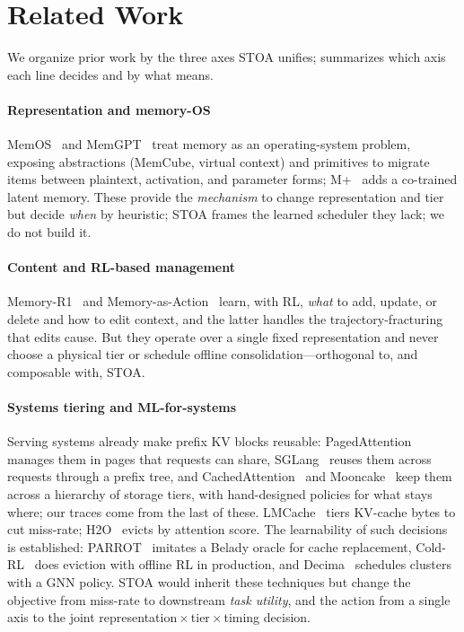 \section{Related Work}
\label{sec:related}

We organize prior work by the three axes STOA unifies;  summarizes which axis each
line decides and by what means.

\paragraph{Representation and memory-OS}
MemOS~\cite{F1_li2025memos} and MemGPT~\cite{P14_packer2023memgpt} treat memory as an operating-system
problem, exposing abstractions (MemCube, virtual context) and primitives to migrate items between
plaintext, activation, and parameter forms; M+~\cite{F2_wang2025mplus} adds a co-trained latent memory.
These provide the \emph{mechanism} to change representation and tier but decide \emph{when} by heuristic;
STOA frames the learned scheduler they lack; we do not build it.

\paragraph{Content and RL-based management}
Memory-R1~\cite{F6_yan2025memoryr1} and Memory-as-Action~\cite{F7_zhang2025memoryasaction} learn, with
RL, \emph{what} to add, update, or delete and how to edit context, and the latter handles the
trajectory-fracturing that edits cause. But they operate over a single fixed representation and never
choose a physical tier or schedule offline consolidation---orthogonal to, and composable with, STOA.

\paragraph{Systems tiering and ML-for-systems}
Serving systems already make prefix KV blocks reusable: PagedAttention~\cite{kwon2023pagedattention}
manages them in pages that requests can share, SGLang~\cite{zheng2024sglang} reuses them across
requests through a prefix tree, and CachedAttention~\cite{gao2024cachedattention} and
Mooncake~\cite{qin2024mooncake} keep them across a hierarchy of storage tiers, with hand-designed
policies for what stays where; our traces come from the last of these.
LMCache~\cite{F5_liu2025lmcache} tiers KV-cache bytes to cut miss-rate; H2O~\cite{S1_zhang2023h2o} evicts
by attention score. The learnability of such decisions is established: PARROT~\cite{S2_liu2020parrot}
imitates a Belady oracle for cache replacement, Cold-RL~\cite{S4_coldrl2025} does eviction with offline
RL in production, and Decima~\cite{S5_mao2019decima} schedules clusters with a GNN policy. STOA would inherit
these techniques but change the objective from miss-rate to downstream \emph{task utility}, and the
action from a single axis to the joint representation\,$\times$\,tier\,$\times$\,timing decision.

